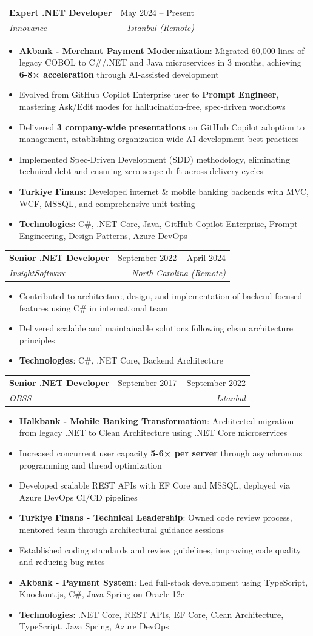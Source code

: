 \documentclass[letterpaper,11pt]{article}
\makeatletter
\newcommand{\resumeItem}[1]{
  \item\small{
    {#1 \vspace{-2pt}}
  }
}
\newcommand{\resumeSubheading}[4]{
  \vspace{-1pt}\item
    \begin{tabular*}{0.97\textwidth}[t]{l@{\extracolsep{\fill}}r}
      \textbf{#1} & #2 \\
      \textit{\small#3} & \textit{\small #4} \\
    \end{tabular*}\vspace{-5pt}
}
\newcommand{\resumeItemListStart}{\begin{itemize}}
\newcommand{\resumeItemListEnd}{\end{itemize}\vspace{-5pt}}
\makeatother
\begin{document}
    \resumeSubheading
      {Expert .NET Developer}{May 2024 -- Present}
      {Innovance}{Istanbul (Remote)}
      \resumeItemListStart
        \resumeItem{\textbf{Akbank - Merchant Payment Modernization}: Migrated 60,000 lines of legacy COBOL to C\#/.NET and Java microservices in 3 months, achieving \textbf{6-8× acceleration} through AI-assisted development}
        \resumeItem{Evolved from GitHub Copilot Enterprise user to \textbf{Prompt Engineer}, mastering Ask/Edit modes for hallucination-free, spec-driven workflows}
        \resumeItem{Delivered \textbf{3 company-wide presentations} on GitHub Copilot adoption to management, establishing organization-wide AI development best practices}
        \resumeItem{Implemented Spec-Driven Development (SDD) methodology, eliminating technical debt and ensuring zero scope drift across delivery cycles}
        \resumeItem{\textbf{Turkiye Finans}: Developed internet \& mobile banking backends with MVC, WCF, MSSQL, and comprehensive unit testing}
        \resumeItem{\textbf{Technologies}: C\#, .NET Core, Java, GitHub Copilot Enterprise, Prompt Engineering, Design Patterns, Azure DevOps}
      \resumeItemListEnd

    \resumeSubheading
      {Senior .NET Developer}{September 2022 -- April 2024}
      {InsightSoftware}{North Carolina (Remote)}
      \resumeItemListStart
        \resumeItem{Contributed to architecture, design, and implementation of backend-focused features using C\# in international team}
        \resumeItem{Delivered scalable and maintainable solutions following clean architecture principles}
        \resumeItem{\textbf{Technologies}: C\#, .NET Core, Backend Architecture}
      \resumeItemListEnd

    \resumeSubheading
      {Senior .NET Developer}{September 2017 -- September 2022}
      {OBSS}{Istanbul}
      \resumeItemListStart
        \resumeItem{\textbf{Halkbank - Mobile Banking Transformation}: Architected migration from legacy .NET to Clean Architecture using .NET Core microservices}
        \resumeItem{Increased concurrent user capacity \textbf{5-6× per server} through asynchronous programming and thread optimization}
        \resumeItem{Developed scalable REST APIs with EF Core and MSSQL, deployed via Azure DevOps CI/CD pipelines}
        \resumeItem{\textbf{Turkiye Finans - Technical Leadership}: Owned code review process, mentored team through architectural guidance sessions}
        \resumeItem{Established coding standards and review guidelines, improving code quality and reducing bug rates}
        \resumeItem{\textbf{Akbank - Payment System}: Led full-stack development using TypeScript, Knockout.js, C\#, Java Spring on Oracle 12c}
        \resumeItem{\textbf{Technologies}: .NET Core, REST APIs, EF Core, Clean Architecture, TypeScript, Java Spring, Azure DevOps}
      \resumeItemListEnd
\end{document}
